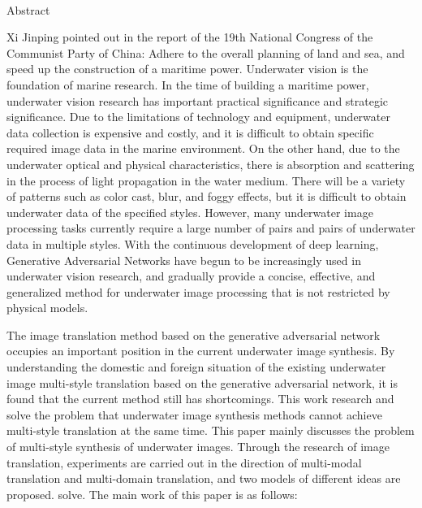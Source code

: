 \newpage

\begin{center}
  {\sanhao[1.5]\heiti\oucetitle\\\vskip7pt Abstract}
\end{center}
{\normalsize\songti

Xi Jinping pointed out in the report of the 19th National Congress of the Communist Party of China: Adhere to the overall planning of land and sea, and speed up the construction of a maritime power. Underwater vision is the foundation of marine research. In the time of building a maritime power, underwater vision research has important practical significance and strategic significance. Due to the limitations of technology and equipment, underwater data collection is expensive and costly, and it is difficult to obtain specific required image data in the marine environment. On the other hand, due to the underwater optical and physical characteristics, there is absorption and scattering in the process of light propagation in the water medium. There will be a variety of patterns such as color cast, blur, and foggy effects, but it is difficult to obtain underwater data of the specified styles. However, many underwater image processing tasks currently require a large number of pairs and pairs of underwater data in multiple styles. With the continuous development of deep learning, Generative Adversarial Networks have begun to be increasingly used in underwater vision research, and gradually provide a concise, effective, and generalized method for underwater image processing that is not restricted by physical models.

The image translation method based on the generative adversarial network occupies an important position in the current underwater image synthesis. By understanding the domestic and foreign situation of the existing underwater image multi-style translation based on the generative adversarial network, it is found that the current method still has shortcomings. This work research and solve the problem that underwater image synthesis methods cannot achieve multi-style translation at the same time. This paper mainly discusses the problem of multi-style synthesis of underwater images. Through the research of image translation, experiments are carried out in the direction of multi-modal translation and multi-domain translation, and two models of different ideas are proposed. solve. The main work of this paper is as follows:

}
